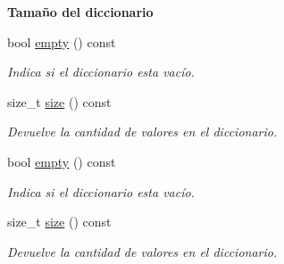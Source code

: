 \begin{Indent}\textbf{ Tamaño del diccionario}\par
\begin{DoxyCompactItemize}
\item 
bool \hyperlink{classaed2_1_1map_a0dcb39283f4877ae59cb756ed1d0c048}{empty} () const
\begin{DoxyCompactList}\small\item\em Indica si el diccionario esta vacío. \end{DoxyCompactList}\item 
size\+\_\+t \hyperlink{classaed2_1_1map_aa6e806b3be6dc0da79adbfae08b571bf}{size} () const
\begin{DoxyCompactList}\small\item\em Devuelve la cantidad de valores en el diccionario. \end{DoxyCompactList}\item 
bool \hyperlink{classaed2_1_1map_a0dcb39283f4877ae59cb756ed1d0c048}{empty} () const
\begin{DoxyCompactList}\small\item\em Indica si el diccionario esta vacío. \end{DoxyCompactList}\item 
size\+\_\+t \hyperlink{classaed2_1_1map_aa6e806b3be6dc0da79adbfae08b571bf}{size} () const
\begin{DoxyCompactList}\small\item\em Devuelve la cantidad de valores en el diccionario. \end{DoxyCompactList}\end{DoxyCompactItemize}
\end{Indent}
